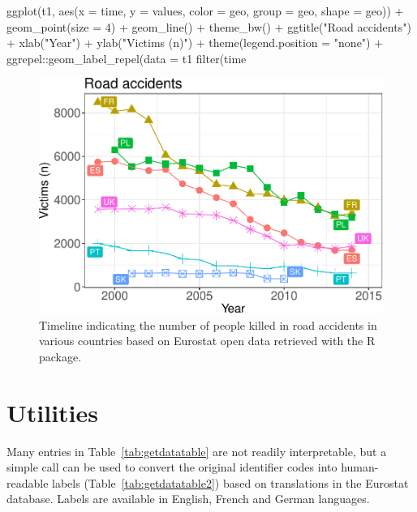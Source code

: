\begin{example}
ggplot(t1, aes(x = time, y = values, color = geo, group = geo, shape = geo)) +
  geom_point(size = 4) + geom_line() + theme_bw() +
  ggtitle("Road accidents") + xlab("Year") + ylab("Victims (n)") +
  theme(legend.position = "none") +
  ggrepel::geom_label_repel(data = t1 %
  filter(time %
\end{example}


\begin{figure}[h]
  \begin{center}
  \includegraphics{2017-manu-roadacc-1}
  \end{center}
  \caption{Timeline indicating the number of people killed in road accidents in various countries based on Eurostat open data retrieved with the  R package.}
  \label{fig:transport}
\end{figure}




\section{Utilities}

Many entries in Table~\ref{tab:getdatatable} are not readily interpretable, but a simple call  can be used to convert the original identifier codes into human-readable labels (Table~\ref{tab:getdatatable2}) based on translations in the Eurostat database. Labels are available in English, French and German languages.

